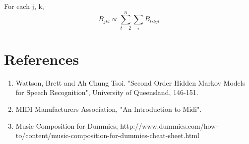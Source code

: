 \documentclass{article} %
\begin{document}
For each j, k, \newline
$$B_{jkl} \propto \sum_{t=2}^n \sum_i B_{tikjl}$$

\newpage

\section{References}
\begin{enumerate}
\item Wattson, Brett and Ah Chung Tsoi. "Second Order Hidden Markov Models for Speech Recognition", University of Queensland, 146-151. 
\item MIDI Manufacturers Association, "An Introduction to Midi". 
\item Music Composition for Dummies, http://www.dummies.com/how-to/content/music-composition-for-dummies-cheat-sheet.html
\end{enumerate}
\end{document}
